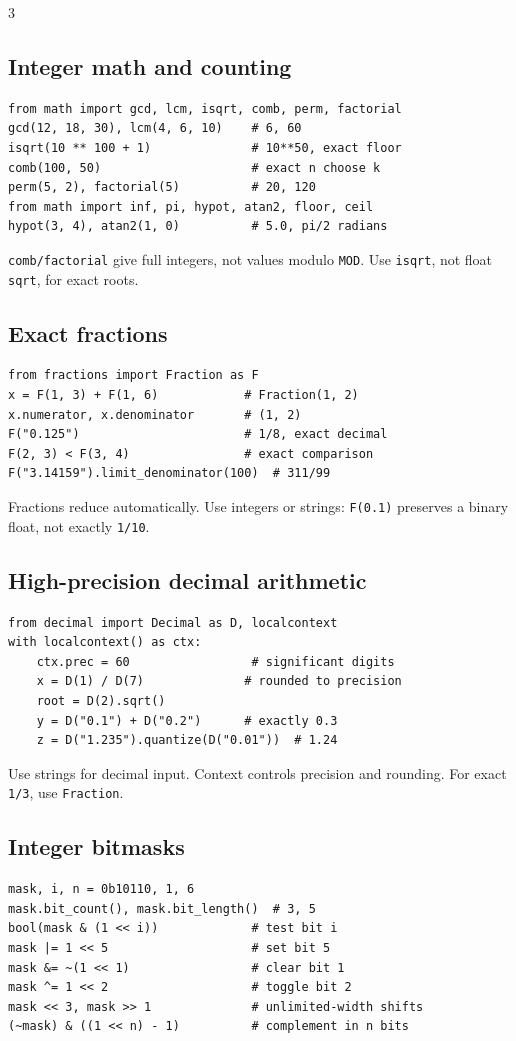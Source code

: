 \documentclass[9pt]{extarticle}
\let\referenceSubsection\subsection
\renewcommand{\subsection}{\needspace{4\baselineskip}\referenceSubsection}
\newcommand{\hint}[1]{{\small #1\par}}
\begin{document}
\begin{multicols*}{3}
\subsection{Integer math and counting}
\begin{lstlisting}[label=py:math]
from math import gcd, lcm, isqrt, comb, perm, factorial
gcd(12, 18, 30), lcm(4, 6, 10)    # 6, 60
isqrt(10 ** 100 + 1)              # 10**50, exact floor
comb(100, 50)                     # exact n choose k
perm(5, 2), factorial(5)          # 20, 120
from math import inf, pi, hypot, atan2, floor, ceil
hypot(3, 4), atan2(1, 0)          # 5.0, pi/2 radians
\end{lstlisting}
\hint{\texttt{comb/factorial} give full integers, not values modulo
\texttt{MOD}. Use \texttt{isqrt}, not float \texttt{sqrt}, for exact roots.}

\subsection{Exact fractions}
\begin{lstlisting}[label=py:fractions]
from fractions import Fraction as F
x = F(1, 3) + F(1, 6)            # Fraction(1, 2)
x.numerator, x.denominator       # (1, 2)
F("0.125")                       # 1/8, exact decimal
F(2, 3) < F(3, 4)                # exact comparison
F("3.14159").limit_denominator(100)  # 311/99
\end{lstlisting}
\hint{Fractions reduce automatically. Use integers or strings:
\texttt{F(0.1)} preserves a binary float, not exactly \texttt{1/10}.}

\subsection{High-precision decimal arithmetic}
\begin{lstlisting}[label=py:decimal]
from decimal import Decimal as D, localcontext
with localcontext() as ctx:
    ctx.prec = 60                 # significant digits
    x = D(1) / D(7)              # rounded to precision
    root = D(2).sqrt()
    y = D("0.1") + D("0.2")      # exactly 0.3
    z = D("1.235").quantize(D("0.01"))  # 1.24
\end{lstlisting}
\hint{Use strings for decimal input. Context controls precision and
rounding. For exact \texttt{1/3}, use \texttt{Fraction}.}

\subsection{Integer bitmasks}
\begin{lstlisting}[label=py:bits]
mask, i, n = 0b10110, 1, 6
mask.bit_count(), mask.bit_length()  # 3, 5
bool(mask & (1 << i))             # test bit i
mask |= 1 << 5                    # set bit 5
mask &= ~(1 << 1)                 # clear bit 1
mask ^= 1 << 2                    # toggle bit 2
mask << 3, mask >> 1              # unlimited-width shifts
(~mask) & ((1 << n) - 1)          # complement in n bits
\end{lstlisting}


\end{multicols*}
\end{document}
